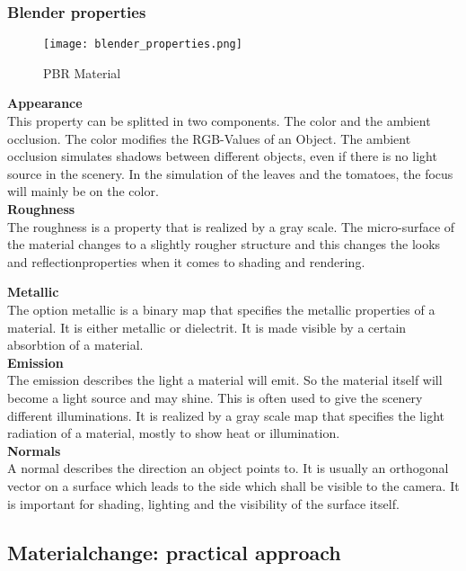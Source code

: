 \subsubsection*{Blender properties}
\begin{figure}[h]
	\centering
	\texttt{[image: blender\_properties.png]}
	\caption{PBR Material}
	\label{pbr}
\end{figure}
\textbf{Appearance}\\
This property can be splitted in two components. The color and the ambient occlusion. The color modifies the RGB-Values of an Object. The ambient occlusion simulates shadows between different objects, even if there is no light source in the scenery. In the simulation of the leaves and the tomatoes, the focus will mainly be on the color.\\

\textbf{Roughness}\\
The roughness is a property that is realized by a gray scale. The micro-surface of the material changes to a slightly rougher structure and this changes the looks and reflectionproperties when it comes to shading and rendering. \newline

\textbf{Metallic}\\
The option metallic is a binary map that specifies the metallic properties of a material. It is either metallic or dielectrit. It is made visible by a certain absorbtion of a material.\\


\textbf{Emission} \\
The emission describes the light a material will emit. So the material itself will become a light source and may shine. This is often used to give the scenery different illuminations. It is realized by a gray scale map that specifies the light radiation of a material, mostly to show heat or illumination.\\


\textbf{Normals} \\
A normal describes the direction an object points to. It is usually an orthogonal vector on a surface which leads to the side which shall be visible to the camera. It is important for shading, lighting  and the visibility of the surface itself.\\

\subsection{Materialchange: practical approach}


